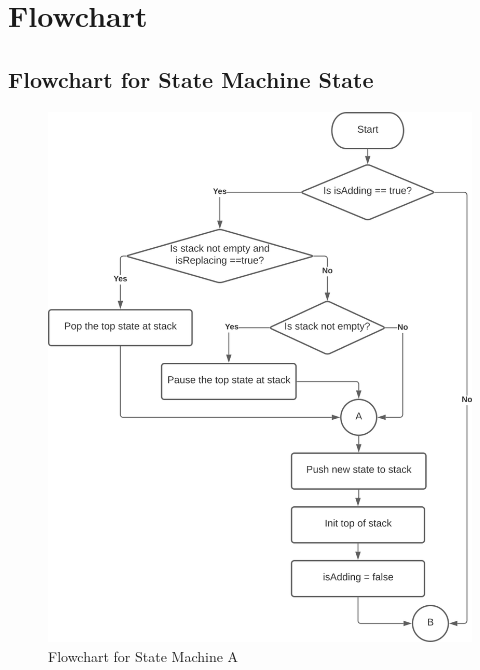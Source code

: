 \documentclass[main]{subfiles}
\begin{document}
	
	
\newpage
\section{Flowchart}
    \subsection{Flowchart for State Machine State}
        \begin{figure}[H]
            \centering
            \includegraphics[scale=0.5]{graphics/flowcharts/state_machine1.png}
            \caption{Flowchart for State Machine A}
            \label{fig:state_machineA}
        \end{figure}
        
\end{document}
